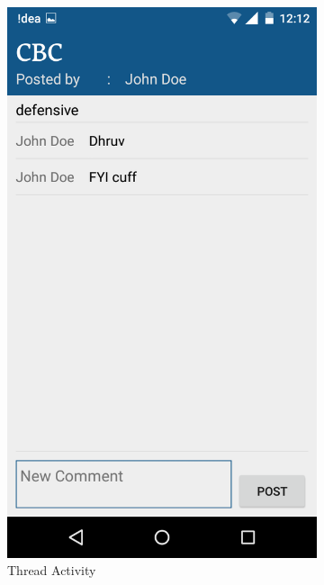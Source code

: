 \documentclass{article}
\begin{document}
\begin{itemize}
\begin{figure}[!h]
\begin{subfigure}{.4\textwidth}
	\includegraphics[width=0.8\linewidth]{pic11}
    \caption*{Thread Activity}
\end{subfigure}
\begin{subfigure}{.4\textwidth}
  \centering

\end{subfigure}
\end{figure}
\end{itemize}
\end{document}
